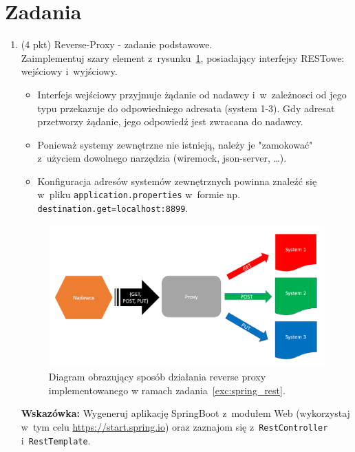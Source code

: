 \documentclass[12pt]{article}
\begin{document}
    \section*{Zadania}
    \begin{enumerate}
        \item\label{exc:spring_rest}
            (4 pkt) Reverse-Proxy - zadanie podstawowe.\\
            Zaimplementuj szary element z~rysunku~\ref{fig:lista_3_proxy}, posiadający interfejsy RESTowe: wejściowy i~wyjściowy.
            \begin{itemize}
                \item Interfejs wejściowy przyjmuje żądanie od nadawcy i~w~zależnosci od jego typu przekazuje do odpowiedniego adresata (system 1-3). Gdy adresat przetworzy żądanie, jego odpowiedź jest zwracana do nadawcy.
                \item Ponieważ systemy zewnętrzne nie istnieją, należy je "zamokować" z~użyciem dowolnego narzędzia (wiremock, json-server, \ldots).
                \item Konfiguracja adresów systemów zewnętrznych powinna znaleźć się w~pliku \texttt{applica\-tion.pro\-per\-ties} w~formie np. \texttt{destination.get=localhost:8899}.
            \end{itemize}
            
            \begin{figure}[hb]
                \centering
                \includegraphics[width=\textwidth]{lista_3_proxy}
                \caption{Diagram obrazujący sposób działania reverse proxy implementowanego w ramach zadania~\ref{exc:spring_rest}.}
                \label{fig:lista_3_proxy}
            \end{figure}

            \textbf{Wskazówka:} Wygeneruj aplikację SpringBoot z~modułem Web (wykorzystaj w~tym celu \url{https://start.spring.io}) oraz zaznajom się z~\texttt{RestController} i~\texttt{RestTemplate}.


\end{enumerate}
\end{document}
